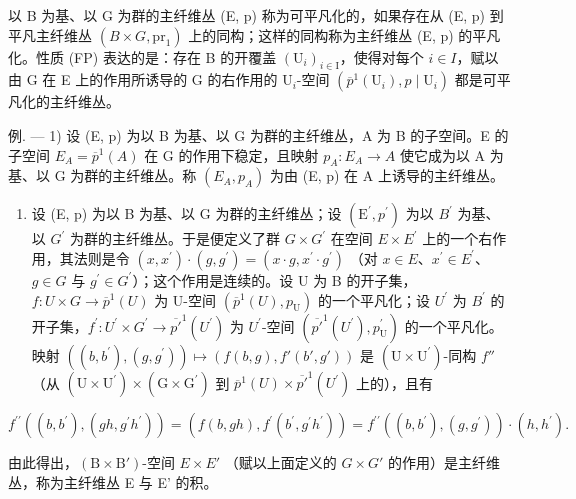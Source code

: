 以 B 为基、以 G 为群的主纤维丛 (E, p) 称为可平凡化的，如果存在从 (E, p) 到平凡主纤维丛 \((B \times G,\mathrm{pr}_{1})\) 上的同构；这样的同构称为主纤维丛 (E, p) 的平凡化。性质 (FP) 表达的是：存在 B 的开覆盖 \((\mathrm{U}_{i})_{i \in \mathrm{I}}\)，使得对每个 \(i \in I\)，赋以由 G 在 E 上的作用所诱导的 G 的右作用的 \(\mathrm{U}_{i}\)-空间 \((\overline{p}^{1}(\mathrm{U}_{i}), p \mid \mathrm{U}_{i})\) 都是可平凡化的主纤维丛。

例. --- 1) 设 (E, p) 为以 B 为基、以 G 为群的主纤维丛，A 为 B 的子空间。E 的子空间 \(E_{A} = \overline{p}^{1}(A)\) 在 G 的作用下稳定，且映射 \(p_{A}: E_{A} \to A\) 使它成为以 A 为基、以 G 为群的主纤维丛。称 \((E_{A}, p_{A})\) 为由 (E, p) 在 A 上诱导的主纤维丛。

\begin{enumerate}
\def\labelenumi{\arabic{enumi})}
\setcounter{enumi}{1}
\tightlist
\item
  设 (E, p) 为以 B 为基、以 G 为群的主纤维丛；设 \((\mathrm{E}^{\prime}, p^{\prime})\) 为以 \(B^{\prime}\) 为基、以 \(G^{\prime}\) 为群的主纤维丛。于是便定义了群 \(G \times G^{\prime}\) 在空间 \(E \times E^{\prime}\) 上的一个右作用，其法则是令 \((x, x^{\prime}) \cdot (g, g^{\prime}) = (x \cdot g, x^{\prime} \cdot g^{\prime})\) （对 \(x \in E\)、\(x^{\prime} \in E^{\prime}\)、\(g \in G\) 与 \(g^{\prime} \in G^{\prime}\)）；这个作用是连续的。设 U 为 B 的开子集，\(f: U \times G \to \overline{p}^{1}(U)\) 为 U-空间 \((\overline{p}^{1}(U), p_{\mathrm{U}})\) 的一个平凡化；设 \(U^{\prime}\) 为 \(B^{\prime}\) 的开子集，\(f^{\prime}: U^{\prime} \times G^{\prime} \to \overline{p'}^{1}(U^{\prime})\) 为 \(U^{\prime}\)-空间 \((\overline{p'}^{1}(U^{\prime}), p_{\mathrm{U}}^{\prime})\) 的一个平凡化。映射 \(((b, b^{\prime}), (g, g^{\prime})) \mapsto (f(b, g), f'(b', g'))\) 是 \((\mathrm{U} \times \mathrm{U}^{\prime})\)-同构 \(f''\) （从 \((\mathrm{U} \times \mathrm{U}^{\prime}) \times (\mathrm{G} \times \mathrm{G}^{\prime})\) 到 \(\overline{p}^{1}(U) \times \overline{p'}^{1}(U^{\prime})\) 上的），且有
\end{enumerate}

\[
f ^ {\prime \prime} ((b, b ^ {\prime}), (g h, g ^ {\prime} h ^ {\prime})) = (f (b, g h), f ^ {\prime} (b ^ {\prime}, g ^ {\prime} h ^ {\prime})) = f ^ {\prime \prime} ((b, b ^ {\prime}), (g, g ^ {\prime})) \cdot (h, h ^ {\prime}).
\]

由此得出，\((\mathrm{B} \times \mathrm{B}')\)-空间 \(E \times E'\) （赋以上面定义的 \(G \times G'\) 的作用）是主纤维丛，称为主纤维丛 E 与 E' 的积。

